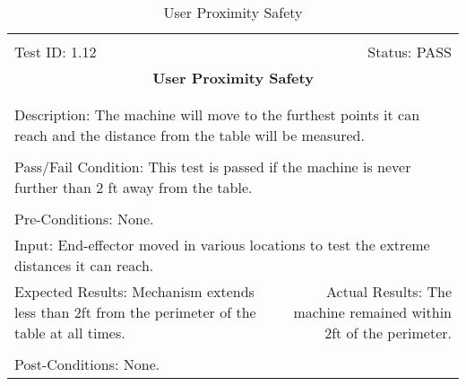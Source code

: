 \documentclass[titlepage]{article}
\begin{document}
\begin{center}
\begin{table}[h!]
\begin{tabular}{|l r|}\hline&\\[-2mm]
	Test ID: 1.12	&Status: PASS\\[-3mm]
	\multicolumn{2}{|c|}{\textbf{\large{User Proximity Safety}}}\\&\\\hline&\\[-3mm]
	\multicolumn{2}{|p{\textwidth}|}{Description: The machine will move to the furthest points it can reach and the distance from the table will be measured.}\\[1mm]\hline&\\[-3mm]
	\multicolumn{2}{|p{\textwidth}|}{Pass/Fail Condition: This test is passed if the machine is never further than 2 ft away from the table.}\\[1mm]\hline&\\[-3mm]
	\multicolumn{2}{|p{\textwidth}|}{Pre-Conditions: None.}\\[4mm]
	\multicolumn{2}{|p{\textwidth}|}{Input: End-effector moved in various locations to test the extreme distances it can reach.}\\[2mm]\hline
	\multicolumn{1}{|p{0.49\textwidth}}{Expected Results: Mechanism extends less than 2ft from the perimeter of the table at all times.}	&\multicolumn{1}{|p{0.45\textwidth}|}{Actual Results: The machine remained within 2ft of the perimeter.}\\\hline&\\[-3mm]
	\multicolumn{2}{|p{\textwidth}|}{Post-Conditions: None.}\\\hline
\end{tabular}
\caption{User Proximity Safety}
\end{table}
\end{center}
\end{document}
